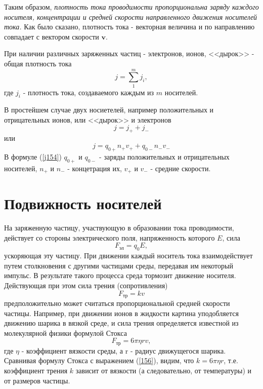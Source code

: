 \documentclass[a4paper,10pt]{book}
\begin{document}
Таким образом, \emph{плотность тока проводимости пропорциональна заряду каждого носителя, концентрации и средней скорости направленного движения носителей тока.} Как было сказано, плотность тока - векторная величина и по направлению совпадает с вектором скорости $\mathbf{v}$.

При наличии различных заряженных частиц - электронов, ионов, <<дырок>> - общая плотность тока
\begin{equation}\label{job}
 j = \sum_1^mj_i,
\end{equation}
где $j_i$ - плотность тока, создаваемого каждым из $m$ носителей.

В простейшем случае двух носиетелей, например положительных и отрицательных ионов, или <<дырок>> и электронов
\begin{equation*}
 j = j_+ + j_-
\end{equation*}
или
\begin{equation}\label{j154}
  j = q_{0+}n_+v_+ + q_{0-}n_-v_-
\end{equation}
В формуле (\ref{j154}) $q_{0+}$ и $q_{0-}$ - заряды положительных и отрицательных носителей, $n_+$ и $n_-$ - концетрация их, $v_+$ и $v_-$ 
- средние скорости.
\section{Подвижность носителей}
На заряженную частицу, участвующую в образовании тока проводимости, действует со стороны электрического поля, напряженность которого $E$, сила
\begin{equation}\label{155}
 F_\text{эл} = q_0E,
\end{equation}
ускоряющая эту частицу. При движении каждый носитель тока взаимодействует путем столкновения с другими частицами среды, передавая им некоторый импульс. В результате такого процесса среда тормозит движение носителя. Действующая при этом сила трения (сопротивления)
\begin{equation}\label{156}
 F_\text{тр} = kv
\end{equation}
предположительно может считаться пропорциональной средней скорости частицы. Например, при движении ионов в жидкости картина уподобляется движению шарика в вязкой среде, и сила трения определяется известной из молекулярной физики формулой Стокса
\begin{equation}
 F_\text{тр} = 6\pi \eta r v, 
\end{equation}
где $\eta$ - коэффициент вязкости среды, а r - радиус движущегося шарика.
Сравнивая формулу Стокса с выражением (\ref{156}), видим, что $k = 6\pi \eta r$, т.е. коэффициент трения $k$ зависит от вязкости (а следовательно, 
от температуры) и от размеров частицы.
\end{document}
